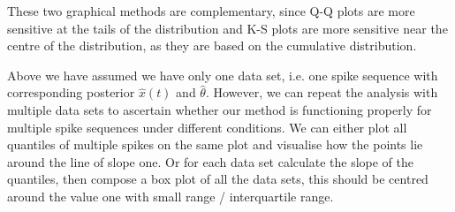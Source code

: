 \documentclass[../main.tex]{subfiles}
\begin{document}
 These two graphical methods are complementary, since Q-Q plots are more sensitive at the tails of the distribution and K-S plots are more sensitive near the centre of the distribution, as they are based on the cumulative distribution.
 
 Above we have assumed we have only one data set, i.e. one spike sequence with corresponding posterior $\hat x(t)$ and $\hat \theta$. However, we can repeat the analysis with multiple data sets to ascertain whether our method is functioning properly for multiple spike sequences under different conditions. We can either plot all quantiles of multiple spikes on the same plot and visualise how the points lie around the line of slope one. Or for each data set calculate the slope of the quantiles, then compose a box plot of all the data sets, this should be centred around the value one with small range / interquartile range. 
 

\end{document}
